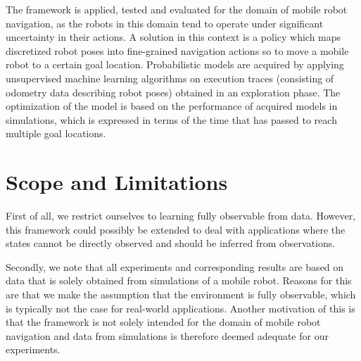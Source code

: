 The framework is applied, tested and evaluated for the domain of mobile robot navigation, as the robots in this domain tend to operate under significant uncertainty in their actions.
A solution in this context is a policy which maps discretized robot poses into fine-grained navigation actions so to move a mobile robot to a certain goal location.
Probabilistic models are acquired by applying unsupervised machine learning algorithms on execution traces (consisting of odometry data describing robot poses) obtained in an exploration phase.
The optimization of the model is based on the performance of acquired models in simulations, which is expressed in terms of the time that has passed to reach multiple goal locations.



\section{Scope and Limitations}
\label{sec:scope-limitations}

First of all, we restrict ourselves to learning fully observable  from data.
However, this framework could possibly be extended to deal with applications where the states cannot be directly observed and should be inferred from observations.

Secondly, we note that all experiments and corresponding results are based on data that is solely obtained from simulations of a mobile robot.
Reasons for this are that we make the assumption that the environment is fully observable, which is typically not the case for real-world applications.
Another motivation of this is that the framework is not solely intended for the domain of mobile robot navigation and data from simulations is therefore deemed adequate for our experiments. %

